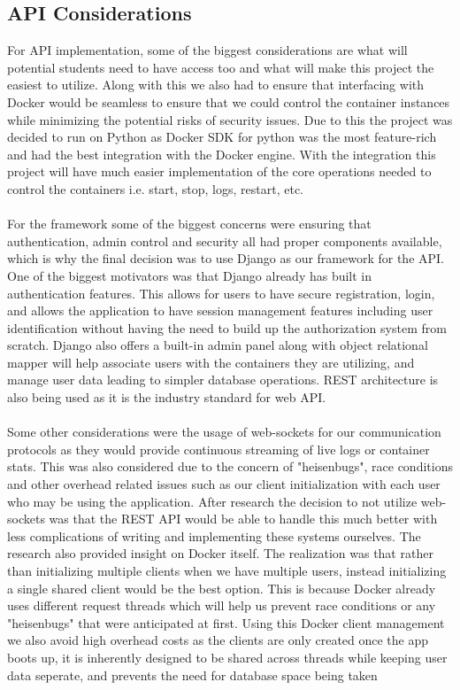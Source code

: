 \documentclass[12pt]{article}
\begin{document}
\subsection{API Considerations}
For API implementation, some of the biggest considerations are what will potential students need to have access too and what will make this project the easiest to utilize. Along with this we also had to ensure that interfacing with Docker would be seamless to ensure that we could control the container instances while minimizing the potential risks of security issues. Due to this the project was decided to run on Python as Docker SDK for python was the most feature-rich and had the best integration with the Docker engine. With the integration this project will have much easier implementation of the core operations needed to control the containers i.e. start, stop, logs, restart, etc.
\\
\\
For the framework some of the biggest concerns were ensuring that authentication, admin control and security all had proper components available, which is why the final decision was to use Django as our framework for the API. One of the biggest motivators was that Django already has built in authentication features. This allows for users to have secure registration, login, and allows the application to have session management features including user identification without having the need to build up the authorization system from scratch. Django also offers a built-in admin panel along with object relational mapper will help associate users with the containers they are utilizing, and manage user data leading to simpler database operations. REST architecture is also being used as it is the industry standard for web API. 
\\
\\
Some other considerations were the usage of web-sockets for our communication protocols as they would provide continuous streaming of live logs or container stats. This was also considered due to the concern of "heisenbugs", race conditions and other overhead related issues such as our client initialization with each user who may be using the application. After research the decision to not utilize web-sockets was that the REST API would be able to handle this much better with less complications of writing and implementing these systems ourselves. The research also provided insight on Docker itself. The realization was that rather than initializing multiple clients when we have multiple users, instead initializing a single shared client would be the best option. This is because Docker already uses different request threads which will help us prevent race conditions or any "heisenbugs" that were anticipated at first. Using this Docker client management we also avoid high overhead costs as the clients are only created once the app boots up, it is inherently designed to be shared across threads while keeping user data seperate, and prevents the need for database space being taken
\end{document}
